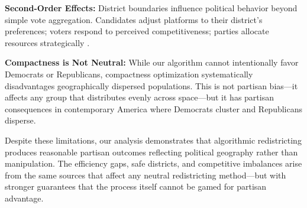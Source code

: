 \textbf{Second-Order Effects:} District boundaries influence political behavior beyond simple vote aggregation. Candidates adjust platforms to their district's preferences; voters respond to perceived competitiveness; parties allocate resources strategically \cite{pegden2017computational}.

\textbf{Compactness is Not Neutral:} While our algorithm cannot intentionally favor Democrats or Republicans, compactness optimization systematically disadvantages geographically dispersed populations. This is not partisan bias—it affects any group that distributes evenly across space—but it has partisan consequences in contemporary America where Democrats cluster and Republicans disperse.

Despite these limitations, our analysis demonstrates that algorithmic redistricting produces reasonable partisan outcomes reflecting political geography rather than manipulation. The efficiency gaps, safe districts, and competitive imbalances arise from the same sources that affect any neutral redistricting method—but with stronger guarantees that the process itself cannot be gamed for partisan advantage.

